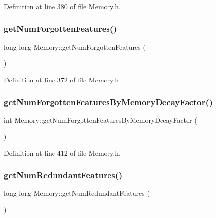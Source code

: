 Definition at line 380 of file Memory.\+h.

\mbox{\label{class_memory_a71384aeaf8830770030cd7e7fc8d4342}} 
\subsubsection{\texorpdfstring{get\+Num\+Forgotten\+Features()}{getNumForgottenFeatures()}}
{\footnotesize\ttfamily long long Memory\+::get\+Num\+Forgotten\+Features (\begin{DoxyParamCaption}{ }\end{DoxyParamCaption})\hspace{0.3cm}{\ttfamily [inline]}}



Definition at line 372 of file Memory.\+h.

\mbox{\label{class_memory_a9b0d2e1ab33d34fef984581921acdf7e}} 
\subsubsection{\texorpdfstring{get\+Num\+Forgotten\+Features\+By\+Memory\+Decay\+Factor()}{getNumForgottenFeaturesByMemoryDecayFactor()}}
{\footnotesize\ttfamily int Memory\+::get\+Num\+Forgotten\+Features\+By\+Memory\+Decay\+Factor (\begin{DoxyParamCaption}{ }\end{DoxyParamCaption})\hspace{0.3cm}{\ttfamily [inline]}}



Definition at line 412 of file Memory.\+h.

\mbox{\label{class_memory_a5ea7ba5bae1d18a31b83b7a9cc5c30cb}} 
\subsubsection{\texorpdfstring{get\+Num\+Redundant\+Features()}{getNumRedundantFeatures()}}
{\footnotesize\ttfamily long long Memory\+::get\+Num\+Redundant\+Features (\begin{DoxyParamCaption}{ }\end{DoxyParamCaption})\hspace{0.3cm}{\ttfamily [inline]}}



